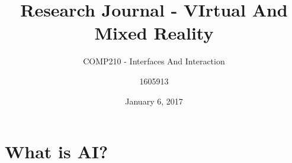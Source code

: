 \documentclass[11pt]{scrartcl}
\title{Research Journal - VIrtual And Mixed Reality}
\date{January 6, 2017}
\subtitle{COMP210 - Interfaces And Interaction}
\author{1605913}
\begin{document}
\maketitle

\section{What is AI?}




\end{document}
